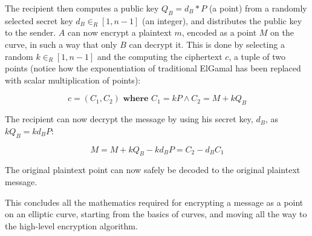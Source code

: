 The recipient then computes a public key \(Q_B = d_B * P\) (a point) from a randomly selected secret key
\(d_B \in_R [1,n-1]\) (an integer), and distributes the public key to the sender. \(A\) can now encrypt
a plaintext \(m\), encoded as a point \(M\) on the curve, in such a way that only \(B\) can decrypt
it. This is done by selecting a random \(k \in_R [1,n-1]\) and the computing the ciphertext \(c\), a
tuple of two points (notice how the exponentiation of traditional ElGamal has been replaced with scalar
multiplication of points):

\begin{equation}
	c = (C_1, C_2)  \textbf{ where }  C_1 = kP \land C_2 = M+kQ_B
\end{equation}

The recipient can now decrypt the message by using his secret key, \(d_B\), as \(kQ_B = kd_BP\):

\begin{equation}
	M = M + k Q_B - k d_B P = C_2 - d_B C_1
\end{equation}

The original plaintext point can now safely be decoded to the original plaintext message.\cite{hankerson2010}

This concludes all the mathematics required for encrypting a message as a point on an elliptic curve, starting from
the basics of curves, and moving all the way to the high-level encryption algorithm.